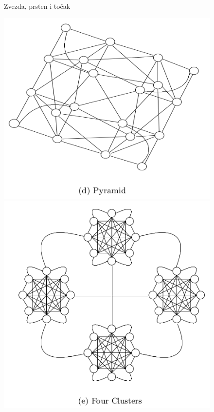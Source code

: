 \documentclass[a4paper]{article}
\begin{document}
\begin{figure}[htp]
    \caption{Zvezda, prsten i točak}
    \label{fig:ZvezdaPrstenTocak}
\end{figure}
\begin{figure}[htp]
    \centering
    \includegraphics[scale=0.2]{Pyramid.png}
    \includegraphics[scale=0.2]{FourClusters.png}

\end{figure}
\end{document}
